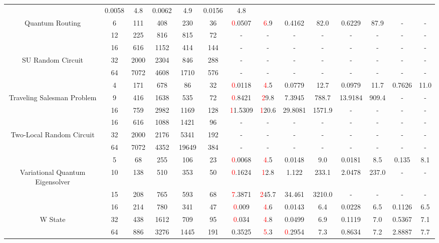 \begin{table}[htb]
{\begin{tabular}{|c|c|c|c|c|c|c|c|c|c|c|c|c|c|}
 & 0.0058 & 4.8
 & 0.0062 & 4.9
 & 0.0156 & 4.8
 \\
Quantum Routing & 
6 & 111 & 408 & 230 & 36
 & \textcolor{red}0.0507 & \textcolor{red}6.9
 & 0.4162 & 82.0
 & 0.6229 & 87.9
 & - & -
 \\
 & 
12 & 225 & 816 & 815 & 72
 & - & -
 & - & -
 & - & -
 & - & -
 \\
\hline
 & 
16 & 616 & 1152 & 414 & 144
 & - & -
 & - & -
 & - & -
 & - & -
 \\
SU Random Circuit & 
32 & 2000 & 2304 & 846 & 288
 & - & -
 & - & -
 & - & -
 & - & -
 \\
 & 
64 & 7072 & 4608 & 1710 & 576
 & - & -
 & - & -
 & - & -
 & - & -
 \\
\hline
 & 
4 & 171 & 678 & 86 & 32
 & \textcolor{red}0.0118 & \textcolor{red}4.5
 & 0.0779 & 12.7
 & 0.0979 & 11.7
 & 0.7626 & 11.0
 \\
Traveling Salesman Problem & 
9 & 416 & 1638 & 535 & 72
 & \textcolor{red}0.8421 & \textcolor{red}29.8
 & 7.3945 & 788.7
 & 13.9184 & 909.4
 & - & -
 \\
 & 
16 & 759 & 2982 & 1169 & 128
 & \textcolor{red}11.5309 & \textcolor{red}120.6
 & 29.8081 & 1571.9
 & - & -
 & - & -
 \\
\hline
 & 
16 & 616 & 1088 & 1421 & 96
 & - & -
 & - & -
 & - & -
 & - & -
 \\
Two-Local Random Circuit & 
32 & 2000 & 2176 & 5341 & 192
 & - & -
 & - & -
 & - & -
 & - & -
 \\
 & 
64 & 7072 & 4352 & 19649 & 384
 & - & -
 & - & -
 & - & -
 & - & -
 \\
\hline
 & 
5 & 68 & 255 & 106 & 23
 & \textcolor{red}0.0068 & \textcolor{red}4.5
 & 0.0148 & 9.0
 & 0.0181 & 8.5
 & 0.135 & 8.1
 \\
Variational Quantum Eigensolver & 
10 & 138 & 510 & 353 & 50
 & \textcolor{red}0.1624 & \textcolor{red}12.8
 & 1.122 & 233.1
 & 2.0478 & 237.0
 & - & -
 \\
 & 
15 & 208 & 765 & 593 & 68
 & \textcolor{red}7.3871 & \textcolor{red}245.7
 & 34.461 & 3210.0
 & - & -
 & - & -
 \\
\hline
 & 
16 & 214 & 780 & 341 & 47
 & \textcolor{red}0.009 & \textcolor{red}4.6
 & 0.0143 & 6.4
 & 0.0228 & 6.5
 & 0.1126 & 6.5
 \\
W State & 
32 & 438 & 1612 & 709 & 95
 & \textcolor{red}0.034 & \textcolor{red}4.8
 & 0.0499 & 6.9
 & 0.1119 & 7.0
 & 0.5367 & 7.1
 \\
 & 
64 & 886 & 3276 & 1445 & 191
 & 0.3525 & \textcolor{red}5.3
 & \textcolor{red}0.2954 & 7.3
 & 0.8634 & 7.2
 & 2.8887 & 7.7
 \\
\hline
\end{tabular}}
\end{table}